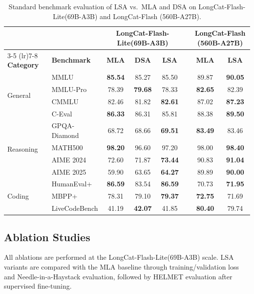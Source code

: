 \documentclass{article}
\newcommand{\longcat}{LongCat-Flash-Lite\xspace}
\begin{document}
\begin{table}[htbp]
\centering
\caption{Standard benchmark evaluation of LSA vs.\ MLA and DSA on \longcat (69B-A3B) and LongCat-Flash (560B-A27B).}
\label{tab:lsa_general}
\small
\setlength{\tabcolsep}{5pt}
\begin{tabular}{ll ccc @{} p{16pt} cc}
\toprule
 & & \multicolumn{3}{c}{\textbf{\longcat (69B-A3B)}} & & \multicolumn{2}{c}{\textbf{LongCat-Flash (560B-A27B)}} \\
\cmidrule(lr){3-5} \cmidrule(lr){7-8}
\textbf{Category} & \textbf{Benchmark} & \textbf{MLA} & \textbf{DSA} & \textbf{LSA} & & \textbf{MLA} & \textbf{LSA} \\
\midrule
\multirow{4}{*}{General}
 & MMLU      & \textbf{85.54} & 85.27 & 85.50 & & 89.87 & \textbf{90.05} \\
 & MMLU-Pro  & 78.39 & \textbf{79.68} & 78.33 & & \textbf{82.65} & 82.39 \\
 & CMMLU     & 82.46 & 81.82 & \textbf{82.61} & & 87.02 & \textbf{87.23} \\
 & C-Eval    & \textbf{86.33} & 86.31 & 85.81 & & 88.38 & \textbf{89.50} \\
\midrule
\multirow{4}{*}{Reasoning}
 & GPQA-Diamond & 68.72 & 68.66 & \textbf{69.51} & & \textbf{83.49} & 83.46 \\
 & MATH500     & \textbf{98.20} & 96.60 & 97.20 & & 98.00 & \textbf{98.40} \\
 & AIME 2024   & 72.60 & 71.87 & \textbf{73.44} & & 90.83 & \textbf{91.04} \\
 & AIME 2025   & 59.90 & 63.65 & \textbf{64.27} & & 89.89 & \textbf{90.00} \\
\midrule
\multirow{3}{*}{Coding}
 & HumanEval+      & \textbf{86.59} & 83.54 & \textbf{86.59} & & 70.73 & \textbf{71.95} \\
 & MBPP+           & 78.31 & 79.10 & \textbf{79.37} & & \textbf{72.75} & 71.69 \\
 & LiveCodeBench   & 41.19 & \textbf{42.07} & 41.85 & & \textbf{80.40} & 79.74 \\
\bottomrule
\end{tabular}
\end{table}


\subsection{Ablation Studies}
\label{sec:ablation}

All ablations are performed at the \longcat (69B-A3B) scale. LSA variants are compared with the MLA baseline through training/validation loss and Needle-in-a-Haystack evaluation, followed by HELMET evaluation after supervised fine-tuning.
\end{document}
